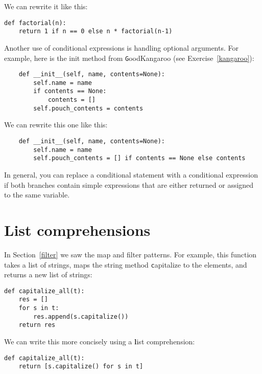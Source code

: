\documentclass[
DIV=11,
fontsize=12,
twoside,
headinclude=false,
titlepage=firstiscover,
abstract=true,
headsepline=true,
footsepline=true,
chapterprefix=true, %
headings=big,
bibliography=totoc,%
captions=tableheading
]{scrbook}
\theoremstyle{definition}
\begin{document}
We can rewrite it like this:

\begin{lstlisting}
def factorial(n):
    return 1 if n == 0 else n * factorial(n-1)
\end{lstlisting}

Another use of conditional expressions is handling optional
arguments.  For example, here is the init method from
{\texttt GoodKangaroo} (see Exercise~\ref{kangaroo}):

\begin{lstlisting}
    def __init__(self, name, contents=None):
        self.name = name
        if contents == None:
            contents = []
        self.pouch_contents = contents
\end{lstlisting}

We can rewrite this one like this:

\begin{lstlisting}
    def __init__(self, name, contents=None):
        self.name = name
        self.pouch_contents = [] if contents == None else contents 
\end{lstlisting}

In general, you can replace a conditional statement with a conditional
expression if both branches contain simple expressions that are
either returned or assigned to the same variable.



\section{List comprehensions}

In Section~\ref{filter} we saw the map and filter patterns.  For
example, this function takes a list of strings, maps the string method
{\texttt capitalize} to the elements, and returns a new list of strings:

\begin{lstlisting}
def capitalize_all(t):
    res = []
    for s in t:
        res.append(s.capitalize())
    return res
\end{lstlisting}

We can write this more concisely using a {\textbf list comprehension}:

\begin{lstlisting}
def capitalize_all(t):
    return [s.capitalize() for s in t]
\end{lstlisting}
\end{document}
